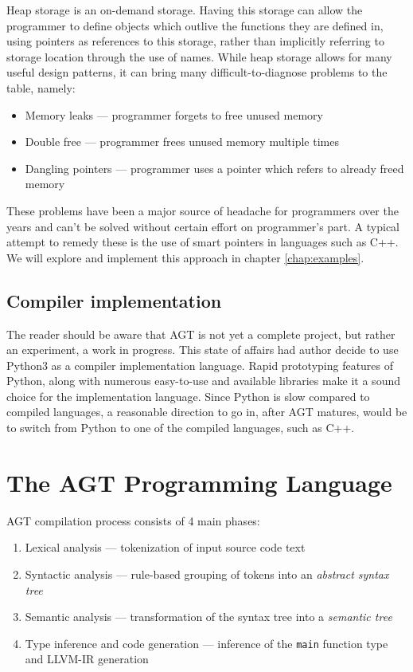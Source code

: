 \documentclass[times, utf8, diplomski]{fer}
\theoremstyle{definition}
\begin{document}
Heap storage is an on-demand storage. Having this storage can allow the programmer to define
objects which outlive the functions they are defined in, using pointers as references to this storage,
rather than implicitly referring to storage location through the use of names.
While heap storage allows for many useful design patterns, it can bring many difficult-to-diagnose
problems to the table, namely:

\begin{itemize}
    \item Memory leaks --- programmer forgets to free unused memory
    \item Double free --- programmer frees unused memory multiple times
    \item Dangling pointers --- programmer uses a pointer which refers to already freed memory
\end{itemize}

These problems have been a major source of headache for programmers over the years and can't be solved
without certain effort on programmer's part. A typical attempt to remedy these is the use of 
smart pointers in languages such as C++. We will explore and implement this approach in 
chapter \ref{chap:examples}.

\section{Compiler implementation}

The reader should be aware that AGT is not yet a complete project, but rather an experiment, 
a work in progress. This state of affairs had author decide to use Python3 as a compiler implementation
language. Rapid prototyping features of Python, along with numerous easy-to-use and available libraries
make it a sound choice for the implementation language. Since Python is slow compared to compiled
languages, a reasonable direction to go in, after AGT matures, would be to switch from Python
to one of the compiled languages, such as C++.

\chapter{The AGT Programming Language}\label{chap:indepth}

AGT compilation process consists of 4 main phases: 

\begin{enumerate}
\item Lexical analysis --- tokenization of input source code text
\item Syntactic analysis --- rule-based grouping of tokens into an \textit{abstract syntax tree}
\item Semantic analysis --- transformation of the syntax tree into a \textit{semantic tree}
\item Type inference and code generation --- inference of the \texttt{main} function type and LLVM-IR generation
\end{enumerate}
\end{document}
